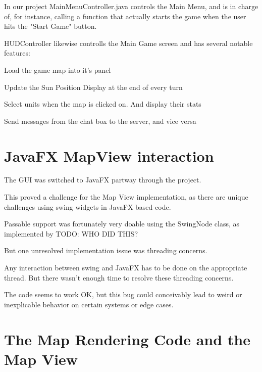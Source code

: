 \documentclass[12pt,a4paper]{article}
\begin{document}
In our project MainMenuController.java controls the Main Menu, and is in charge
of, for instance, calling a function that actually starts the game when the
user hits the "Start Game" button.

HUDController likewise controlls the Main Game screen and has several notable
features:

\begin{itemize}
\begin{item} Load the game map into it's panel \end{item}
\begin{item} Update the Sun Position Display at the end of every turn \end{item}
\begin{item} Select units when the map is clicked on. And display their stats
\end{item}
\begin{item} Send messages from the chat box to the server, and vice versa
\end{item}
\end{itemize}

\section{JavaFX MapView interaction}
The GUI was switched to JavaFX partway through the project.

This proved a challenge for the Map View implementation, as there are unique
challenges using swing widgets in JavaFX based code.

Passable support was fortunately very doable using the SwingNode class,
as implemented by TODO: WHO DID THIS?

But one unresolved implementation issue was threading concerns.

Any interaction between swing and JavaFX has to be done on the appropriate
thread. But there wasn't enough time to resolve these threading concerns.

The code seems to work OK, but this bug could conceivably lead to weird
or inexplicable behavior on certain systems or edge cases.

\section{The Map Rendering Code and the Map View}
\end{document}
